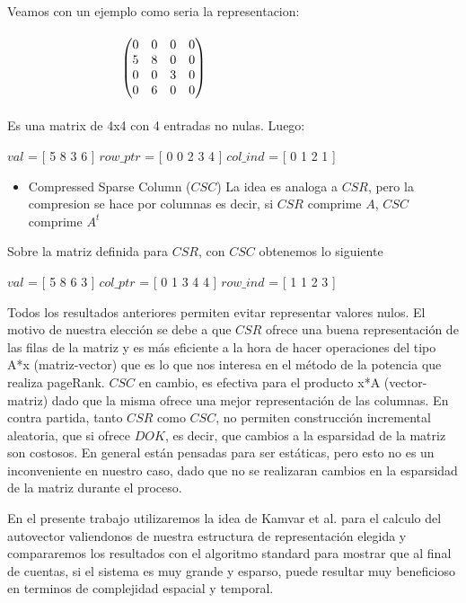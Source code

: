Veamos con un ejemplo como seria la representacion:
\\\\
$\hspace{3.2cm}\begin{pmatrix} 0 & 0 & 0 & 0 \\ 5 & 8 & 0 & 0 \\ 0 & 0 & 3 & 0 \\ 0 & 6 & 0 & 0 \\ \end{pmatrix}$
\\\\
Es una matrix de 4x4 con 4 entradas no nulas. Luego:

   $val$  = [ 5 8 3 6 ]
   $row\_ptr$ = [ 0 0 2 3 4 ]
   $col\_ind$ = [ 0 1 2 1 ]

\begin{itemize}
\item Compressed Sparse Column ($CSC$)
La idea es analoga a $CSR$, pero la compresion se hace por columnas es decir, si $CSR$ comprime $A$, $CSC$ comprime $A^t$  
\end{itemize}

Sobre la matriz definida para $CSR$, con $CSC$ obtenemos lo siguiente

   $val$  = [ 5 8 6 3 ]
   $col\_ptr$ = [ 0 1 3 4 4 ]   
   $row\_ind$ = [ 1 1 2 3 ]

Todos los resultados anteriores permiten evitar representar valores nulos.	
El motivo de nuestra elección se debe a que $CSR$ ofrece una buena representación de las filas de la matriz y es más eficiente a la hora de hacer operaciones del tipo A*x (matriz-vector) que es lo que nos interesa en el método de la potencia que realiza pageRank. $CSC$ en cambio, es efectiva para el producto x*A (vector-matriz) dado que la misma ofrece una mejor representación de las columnas. En contra partida, tanto $CSR$ como $CSC$, no permiten construcción incremental aleatoria, que si ofrece $DOK$, es decir, que cambios a la esparsidad de la matriz son costosos. En general están pensadas para ser estáticas, pero esto no es un inconveniente en nuestro caso, dado que no se realizaran cambios en la esparsidad de la matriz durante el proceso.

En el presente trabajo utilizaremos la idea de Kamvar et al. \cite[Algoritmo 1]{Kamvar2003} para el calculo del autovector valiendonos de nuestra estructura de representación elegida y compararemos los resultados con el algoritmo standard para mostrar que al final de cuentas, si el sistema es muy grande y esparso, puede resultar muy beneficioso en terminos de complejidad espacial y temporal.

